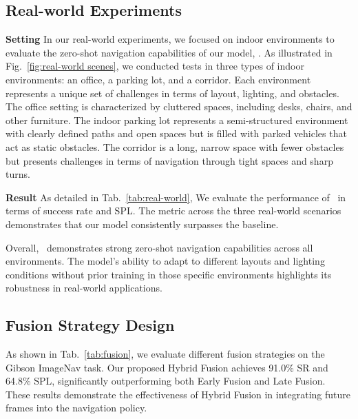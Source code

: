 \subsection{Real-world Experiments}
\textbf{Setting}
 In our real-world experiments, we focused on indoor environments to evaluate the zero-shot navigation capabilities of our model, \mname. As illustrated in  Fig.~\ref{fig:real-world scenes}, we conducted tests in three types of indoor environments: an office, a parking lot, and a corridor. Each environment represents a unique set of challenges in terms of layout, lighting, and obstacles. 
%
The office setting is characterized by cluttered spaces, including desks, chairs, and other furniture. 
%
The indoor parking lot represents a semi-structured environment with clearly defined paths and open spaces but is filled with parked vehicles that act as static obstacles. 
%
The corridor is a long, narrow space with fewer obstacles but presents challenges in terms of navigation through tight spaces and sharp turns.

\textbf{Result}
As detailed in Tab.~\ref{tab:real-world}, We evaluate the performance of \mname ~in terms of success rate and SPL. The metric across the three real-world scenarios demonstrates that our model consistently surpasses the baseline.

Overall, \mname ~demonstrates strong zero-shot navigation capabilities across all environments. The model's ability to adapt to different layouts and lighting conditions without prior training in those specific environments highlights its robustness in real-world applications.


\subsection{Fusion Strategy Design}
As shown in Tab.~\ref{tab:fusion}, we evaluate different fusion strategies on the Gibson ImageNav task. Our proposed Hybrid Fusion achieves 91.0\% SR and 64.8\% SPL, significantly outperforming both Early Fusion and Late Fusion. These results demonstrate the effectiveness of Hybrid Fusion in integrating future frames into the navigation policy.




